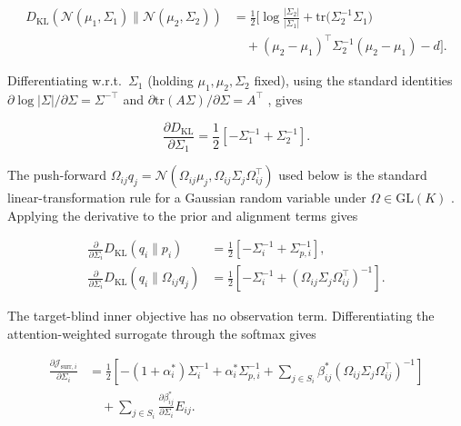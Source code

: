 \documentclass[twoside,11pt]{article}
\begin{document}
\begin{align}
D_{\mathrm{KL}} \left(
\mathcal{N}(\mu_1, \Sigma_1)
 \|
\mathcal{N}(\mu_2, \Sigma_2)
\right)
&=
\frac{1}{2}
\Big[
\log \frac{|\Sigma_2|}{|\Sigma_1|}
+ \mathrm{tr} \big(\Sigma_2^{-1}\Sigma_1\big)
\\ &\quad
+ (\mu_2 - \mu_1)^\top
  \Sigma_2^{-1}
  (\mu_2 - \mu_1)
- d
\Big].
\label{eq:gaussian_KL}
\end{align}


Differentiating w.r.t.\ $\Sigma_1$ (holding $\mu_1,\mu_2,\Sigma_2$ fixed), using the standard identities $\partial \log|\Sigma|/\partial \Sigma = \Sigma^{-\top}$ and $\partial \mathrm{tr}(A\Sigma)/\partial \Sigma = A^\top$ \citep{petersen2012matrix}, gives

\begin{equation}
\frac{\partial D_{\mathrm{KL}}}{\partial \Sigma_1}
=\frac{1}{2}\left[
-\Sigma_1^{-1}
+ \Sigma_2^{-1}
\right].
\end{equation}

The push-forward $\Omega_{ij} q_j = \mathcal{N}(\Omega_{ij}\mu_j, \Omega_{ij}\Sigma_j\Omega_{ij}^\top)$ used below is the standard linear-transformation rule for a Gaussian random variable under $\Omega \in \mathrm{GL}(K)$ \citep[\S2.3.3]{Bishop2006}. Applying the derivative to the prior and alignment terms gives

\begin{align}
\frac{\partial}{\partial \Sigma_i}
D_{\mathrm{KL}}(q_i \| p_i)
&=\frac{1}{2}\left[
-\Sigma_i^{-1}
+ \Sigma_{p,i}^{-1}
\right],
\\[6pt]
\frac{\partial}{\partial \Sigma_i}
D_{\mathrm{KL}}(q_i \| \Omega_{ij} q_j)
&=
\frac{1}{2}\left[
-\Sigma_i^{-1}
+ (\Omega_{ij}\Sigma_j\Omega_{ij}^\top)^{-1}
\right].
\end{align}

The target-blind inner objective has no observation term. Differentiating the attention-weighted surrogate through the softmax gives

\begin{equation}
\boxed{
\begin{aligned}
\frac{\partial \mathcal{J}_{\mathrm{surr},i}}{\partial \Sigma_i}
&=\frac{1}{2}
\left[
-(1+\alpha_i^*) \Sigma_i^{-1}
+ \alpha_i^*\Sigma_{p,i}^{-1}
+ \sum_{j\in S_i} \beta_{ij}^*
(\Omega_{ij}\Sigma_j\Omega_{ij}^\top)^{-1}
\right] \\
&\quad + \sum_{j\in S_i}
\frac{\partial \beta_{ij}^*}{\partial \Sigma_i}E_{ij}.
\end{aligned}
}
\label{eq:Sigma_gradient_final}
\end{equation}
\end{document}
